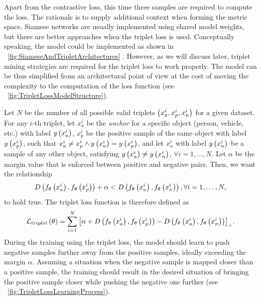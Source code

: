 Apart from the contrastive loss, this time three samples are required to compute the loss. The rationale is to supply additional context when forming the metric space. Siamese networks are usually implemented using shared model weights, but there are better approaches when the triplet loss is used. Conceptually speaking, the model could be implemented as shown in \figtext{}~\ref{fig:SiameseAndTripletArchitectures} . However, as we will discuss later, triplet mining strategies are required for the triplet loss to work properly. The model can be thus simplified from an architectural point of view at the cost of moving the complexity to the computation of the loss function (see \figtext{}~\ref{fig:TripletLossModelStructure}).

Let $N$ be the number of all possible valid triplets $\left( {x_a^i, x_p^i, x_n^i} \right)$ for a given dataset. For any $i$-th triplet, let $x_a^i$ be the \emph{anchor} for a specific object (person, vehicle, etc.) with label ${y} \left( x_a^i \right)$, $x_p^i$ be the positive sample of the same object with label ${y} \left( x_p^i \right)$, such that $x_a^i \neq x_p^i \land {y} \left( x_a^i \right) = {y} \left( x_p^i \right)$, and let $x_n^i$ with label ${y} \left( x_n^i \right)$ be a sample of any other object, satisfying ${y} \left( x_a^i \right) \neq {y} \left( x_n^i \right)$, $\forall i = 1, \dots, N$. Let $\alpha$ be the margin value that is enforced between positive and negative pairs. Then, we want the relationship~\cite{schroff2015facenet}
\begin{equation}
    \label{eq:TripletDistanceConstraint}
    {D} \left( {f_\theta} \left( x_a^i \right), {f_\theta} \left( x_p^i \right) \right) + \alpha < {D} \left( {f_\theta} \left( x_a^i \right), {f_\theta} \left( x_n^i \right) \right), \forall i = 1, \dots, N,
\end{equation}
to hold true. The triplet loss function is therefore defined as~\cite{schroff2015facenet}
\begin{equation}
    \label{eq:TripletLoss}
    {\mathcal{L}_{triplet}} \left( \theta \right) =
    \sum_{i = 1}^{N}
    {\left[ {
        \alpha +
        {D} \left( {f_\theta} \left( x_a^i \right), {f_\theta} \left( x_p^i \right) \right) -
        {D} \left( {f_\theta} \left( x_a^i \right), {f_\theta} \left( x_n^i \right) \right)
    } \right]}_+.
\end{equation}
During the training using the triplet loss, the model should learn to push negative samples further away from the positive samples, ideally exceeding the margin $\alpha$. Assuming a situation when the negative sample is mapped closer than a positive sample, the training should result in the desired situation of bringing the positive sample closer while pushing the negative one further (see \figtext{}~\ref{fig:TripletLossLearningProcess}).


